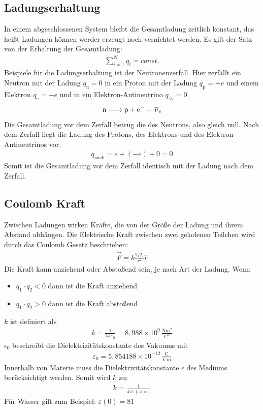 \documentclass{article}
\begin{document}
\subsection{Ladungserhaltung}
In einem abgeschlossenen System bleibt die Gesamtladung zeitlich konstant, das heißt Ladungen können
werder erzeugt noch vernichtet werden. Es gilt der Satz von der Erhaltung der Gesamtladung:
\begin{align}
    \sum_{i=1}^N q_i=const.
\end{align}
Beispiele für die Ladungserhaltung ist der Neutronenzerfall.
Hier zerfällt ein Neutron mit der Ladung $q_\mathrm{n}=0$ in ein Proton
mit der Ladung $q_\mathrm{p}=+e$ und einem Elektron $q_e=-e$ und in ein Elektron-Antineutrino $q_{\,\overline{\nu}_e}=0$.
\begin{align}
    \ce{n -> p + e^- + \,\overline{\nu}_e}
\end{align}
Die Gesamtladung vor dem Zerfall betrug die des Neutrons, also gleich null. Nach dem Zerfall liegt die Ladung des Protons,
des Elektrons und des Elektron-Antineutrinos vor. 
\begin{align}
    q_\mathrm{nach}=e+(-e)+0=0
\end{align}
Somit ist die Gesamtladung vor dem Zerfall identisch mit der Ladung nach dem Zerfall.


\subsection{Coulomb Kraft}
Zwischen Ladungen wirken Kräfte, die von der Größe der Ladung und ihrem Abstand abhängen.
Die Elektrische Kraft zwischen zwei geladenen Teilchen wird durch das Coulomb Gesetz beschrieben:
\begin{align}
    \vec{F}=k\frac{q_1q_2}{r^2}\hat{r}
\end{align}
Die Kraft kann anziehend oder Abstoßend sein, je nach Art der Ladung.
Wenn 
\begin{itemize}
    \item $q_1\cdot q_2 < 0$ dann ist die Kraft anziehend
    \item $q_1\cdot q_2 > 0$ dann ist die Kraft abstoßend
\end{itemize}
$k$ ist definiert als 
\begin{align}
    k=\frac{1}{4\pi\varepsilon_0}=8,988\times 10^9\,\frac{\mathrm{Nm^2}}{\mathrm{C}^2}
\end{align}
$\epsilon_0$ beschreibt die Dielektrizitätskonstante des Vakuums mit 
\begin{align}
    \varepsilon_0=5,854188\times 10^{-12}\,\frac{\mathrm{C}}{\mathrm{V\,m}}
\end{align}
Innerhalb von Materie muss die Dielektrizitätskonstante $\epsilon$ des Mediums berücksichtigt werden.
Somit wird $k$ zu:
\begin{align}
    k=\frac{1}{4\pi\varepsilon(\omega)\varepsilon_0}
\end{align}
Für Wasser gilt zum Beispiel: $\varepsilon(0)=81$\\
\end{document}
